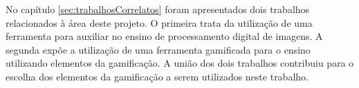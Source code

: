 \documentclass[
	12pt,				%
	oneside,			%
	a4paper,			%
	english,			%
	french,				%
	spanish,			%
	brazil,				%
	]{abntex2}
\begin{document}
No capítulo \ref{sec:trabalhosCorrelatos} foram apresentados dois trabalhos relacionados à área deste projeto. O primeira trata da utilização de uma ferramenta para auxiliar no ensino de processamento digital de imagens. A segunda expõe a utilização de uma ferramenta gamificada para o ensino utilizando elementos da gamificação. A união dos dois trabalhos contribuiu para o escolha dos elementos da gamificação a serem utilizados neste trabalho.

\postextual





\end{document}
